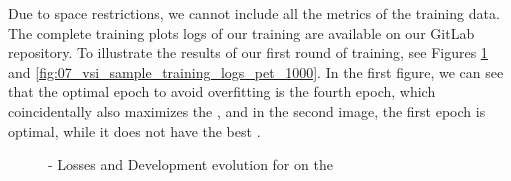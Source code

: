 
Due to space restrictions, we cannot include all the metrics of the training data. The complete training plots logs of our training are available on our GitLab repository. To illustrate the results of our first round of training, see Figures \ref{fig:07_vsi_sample_training_logs_unbalanced} and \ref{fig:07_vsi_sample_training_logs_pet_1000}. In the first figure, we can see that the optimal epoch to avoid overfitting is the fourth epoch, which coincidentally also maximizes the \fTwo{}, and in the second image, the first epoch is optimal, while it does not have the best \fTwo{}.


\begin{figure}[ht]
    \centering
    \hfill
    \hfill
    \caption{\unbalanced{} - Losses and Development \fTwo{} evolution for \bertmultilingual{} on the \trafilaturaTitle{}}
    \label{fig:07_vsi_sample_training_logs_unbalanced}
\end{figure}



